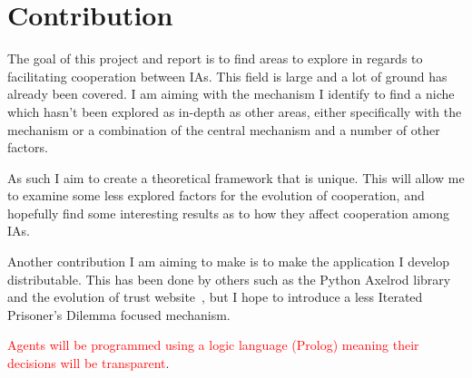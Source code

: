 \documentclass[]{final_report}
\begin{document}
\section{Contribution}
The goal of this project and report is to find areas to explore in regards to facilitating cooperation between IAs. This field is large and a lot of ground has already been covered. I am aiming with the mechanism I identify to find a niche which hasn't been explored as in-depth as other areas, either specifically with the mechanism or a combination of the central mechanism and a number of other factors.\par
As such I aim to create a theoretical framework that is unique. This will allow me to examine some less explored factors for the evolution of cooperation, and hopefully find some interesting results as to how they affect cooperation among IAs.\par
Another contribution I am aiming to make is to make the application I develop distributable. This has been done by others such as the Python Axelrod library~\cite{axelrodproject} and the evolution of trust website~\cite{evol_trust}, but I hope to introduce a less Iterated Prisoner's Dilemma focused mechanism.\par
\textcolor{red}{Agents will be programmed using a logic language (Prolog) meaning their decisions will be transparent}.
\end{document}
